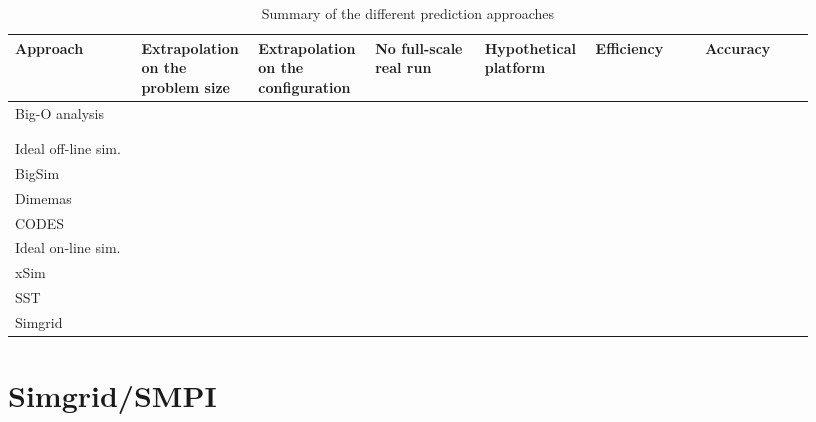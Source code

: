         \begin{landscape}
            \newcommand{\yess}{\textcolor{green}{\cmark}}
            \newcommand{\nope}{\textcolor{red}{\xmark}}
            \begin{table}[htpb]
                \centering
                \caption{Summary of the different prediction approaches}
                \label{tab:prediction:state_of_the_art}
                \begin{tabular}{p{0.15\linewidth} | p{0.13\linewidth} p{0.13\linewidth} p{0.13\linewidth} p{0.13\linewidth}
                    p{0.13\linewidth} p{0.13\linewidth} }
                    Approach & Extrapolation on the problem size & Extrapolation on the configuration & No full-scale real
                    run & Hypothetical platform & Efficiency & Accuracy\\
                    \hline
                    \rowcolor{gray80} Big-O analysis          & \yess & \yess & \yess & \yess & \yess \yess & \nope\nope\\
                    \cite{hpl_prediction}   & \yess & \nope & \yess & \nope & \yess & \yess\\
                    \cite{Singh_2007}       & \nope & \yess & \nope & \nope & \yess & \yess\\
                    \hline
                    \rowcolor{gray80} Ideal off-line sim.     & \nope & \nope & \nope & \yess & \yess & \yess\\
                    BigSim\cite{bigsim_04}  & \\
                    Dimemas\cite{dimemas}   & \\
                    CODES\cite{CODES}       & \\
                    \hline
                    \rowcolor{gray80} Ideal on-line sim.      & \yess & \yess & \yess & \yess & \yess & \yess\\
                    xSim\cite{xsim}         & \\
                    SST\cite{sstmacro}      & \\
                    Simgrid\cite{simgrid}   & \yess & \yess & \yess & \yess & \yess & \yess\\
                \end{tabular}
            \end{table}
        \end{landscape}

    \section{Simgrid/SMPI}%
    \label{sec:simgrid_smpi}

